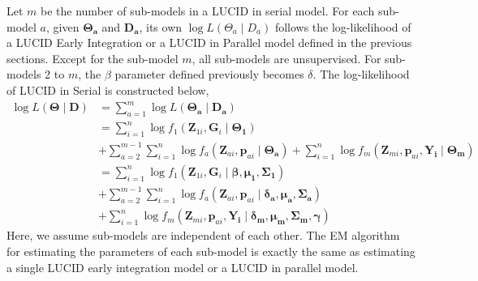 Let $m$ be the number of sub-models in a LUCID in serial model. For each sub-model $a$, given $\bm{\Theta_a}$ and $\bm{D_a}$, its own $\log L({\Theta_a} \mid {D_a})$ follows the log-likelihood of a LUCID Early Integration or a LUCID in Parallel model defined in the previous sections. Except for the sub-model $m$, all sub-models are unsupervised. For sub-models 2 to $m$, the $\beta$ parameter defined previously becomes $\delta$. The log-likelihood of LUCID in Serial is constructed below,
\begin{equation}
    \begin{aligned}
         \log L(\bm{\Theta}\mid \boldsymbol{D}) & = \sum_{a = 1}^m \log L(\bm{\Theta_a}\mid \bm{D_a}) \\ &
         = \sum_{i = 1}^n \log f_1(\bm{Z}_{1i}, \bm{G}_i \mid \bm{\Theta_1}) \\ &
         + \sum_{a = 2}^{m-1} \sum_{i = 1}^n \log f_a(\bm{Z}_{ai}, \bm{p}_{ai} \mid \bm{\Theta_a}) + \sum_{i = 1}^n \log f_m(\bm{Z}_{mi}, \bm{p}_{ai}, \bm{Y_i} \mid \bm{\Theta_m}) \\ &
         = \sum_{i = 1}^n \log f_1(\bm{Z}_{1i}, \bm{G}_i \mid \bm{\beta}, \bm{\mu_1}, \bm{\Sigma_1}) \\ &
         + \sum_{a = 2}^{m-1} \sum_{i = 1}^n \log f_a(\bm{Z}_{ai}, \bm{p}_{ai} \mid \bm{\delta_a}, \bm{\mu_a}, \bm{\Sigma_a}) \\ &
         + \sum_{i = 1}^n \log f_m(\bm{Z}_{mi}, \bm{p}_{ai}, \bm{Y_i} \mid \bm{\delta_m}, \bm{\mu_m}, \bm{\Sigma_m}, \bm{\gamma})
    \end{aligned}
    \label{eq_27}
\end{equation}
Here, we assume sub-models are independent of each other. The EM algorithm for estimating the parameters of each sub-model is exactly the same as estimating a single LUCID early integration model or a LUCID in parallel model.
